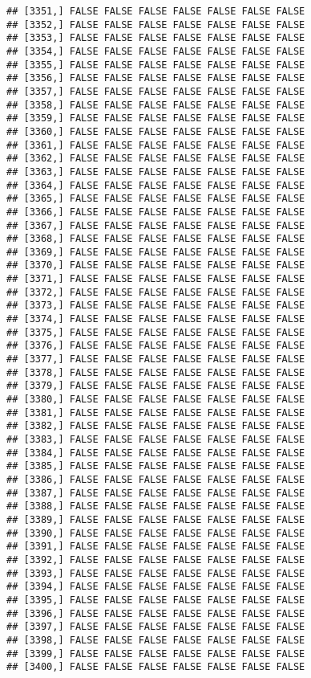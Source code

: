\documentclass[
]{article}
\begin{document}
\begin{verbatim}
## [3351,] FALSE FALSE FALSE FALSE FALSE FALSE FALSE
## [3352,] FALSE FALSE FALSE FALSE FALSE FALSE FALSE
## [3353,] FALSE FALSE FALSE FALSE FALSE FALSE FALSE
## [3354,] FALSE FALSE FALSE FALSE FALSE FALSE FALSE
## [3355,] FALSE FALSE FALSE FALSE FALSE FALSE FALSE
## [3356,] FALSE FALSE FALSE FALSE FALSE FALSE FALSE
## [3357,] FALSE FALSE FALSE FALSE FALSE FALSE FALSE
## [3358,] FALSE FALSE FALSE FALSE FALSE FALSE FALSE
## [3359,] FALSE FALSE FALSE FALSE FALSE FALSE FALSE
## [3360,] FALSE FALSE FALSE FALSE FALSE FALSE FALSE
## [3361,] FALSE FALSE FALSE FALSE FALSE FALSE FALSE
## [3362,] FALSE FALSE FALSE FALSE FALSE FALSE FALSE
## [3363,] FALSE FALSE FALSE FALSE FALSE FALSE FALSE
## [3364,] FALSE FALSE FALSE FALSE FALSE FALSE FALSE
## [3365,] FALSE FALSE FALSE FALSE FALSE FALSE FALSE
## [3366,] FALSE FALSE FALSE FALSE FALSE FALSE FALSE
## [3367,] FALSE FALSE FALSE FALSE FALSE FALSE FALSE
## [3368,] FALSE FALSE FALSE FALSE FALSE FALSE FALSE
## [3369,] FALSE FALSE FALSE FALSE FALSE FALSE FALSE
## [3370,] FALSE FALSE FALSE FALSE FALSE FALSE FALSE
## [3371,] FALSE FALSE FALSE FALSE FALSE FALSE FALSE
## [3372,] FALSE FALSE FALSE FALSE FALSE FALSE FALSE
## [3373,] FALSE FALSE FALSE FALSE FALSE FALSE FALSE
## [3374,] FALSE FALSE FALSE FALSE FALSE FALSE FALSE
## [3375,] FALSE FALSE FALSE FALSE FALSE FALSE FALSE
## [3376,] FALSE FALSE FALSE FALSE FALSE FALSE FALSE
## [3377,] FALSE FALSE FALSE FALSE FALSE FALSE FALSE
## [3378,] FALSE FALSE FALSE FALSE FALSE FALSE FALSE
## [3379,] FALSE FALSE FALSE FALSE FALSE FALSE FALSE
## [3380,] FALSE FALSE FALSE FALSE FALSE FALSE FALSE
## [3381,] FALSE FALSE FALSE FALSE FALSE FALSE FALSE
## [3382,] FALSE FALSE FALSE FALSE FALSE FALSE FALSE
## [3383,] FALSE FALSE FALSE FALSE FALSE FALSE FALSE
## [3384,] FALSE FALSE FALSE FALSE FALSE FALSE FALSE
## [3385,] FALSE FALSE FALSE FALSE FALSE FALSE FALSE
## [3386,] FALSE FALSE FALSE FALSE FALSE FALSE FALSE
## [3387,] FALSE FALSE FALSE FALSE FALSE FALSE FALSE
## [3388,] FALSE FALSE FALSE FALSE FALSE FALSE FALSE
## [3389,] FALSE FALSE FALSE FALSE FALSE FALSE FALSE
## [3390,] FALSE FALSE FALSE FALSE FALSE FALSE FALSE
## [3391,] FALSE FALSE FALSE FALSE FALSE FALSE FALSE
## [3392,] FALSE FALSE FALSE FALSE FALSE FALSE FALSE
## [3393,] FALSE FALSE FALSE FALSE FALSE FALSE FALSE
## [3394,] FALSE FALSE FALSE FALSE FALSE FALSE FALSE
## [3395,] FALSE FALSE FALSE FALSE FALSE FALSE FALSE
## [3396,] FALSE FALSE FALSE FALSE FALSE FALSE FALSE
## [3397,] FALSE FALSE FALSE FALSE FALSE FALSE FALSE
## [3398,] FALSE FALSE FALSE FALSE FALSE FALSE FALSE
## [3399,] FALSE FALSE FALSE FALSE FALSE FALSE FALSE
## [3400,] FALSE FALSE FALSE FALSE FALSE FALSE FALSE

\end{verbatim}
\end{document}
